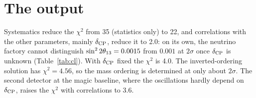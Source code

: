 \section{The output}


\noindent
Systematics reduce the $\chi^2$ from 35 (statistics only) to 22, and
correlations with the other parameters, mainly $\delta_\mathrm{CP}$, reduce it to 2.0: on
its own, the neutrino factory cannot distinguish $\sin^2 2\theta_{13}=0.0015$ from
$0.001$ at $2\sigma$ once $\delta_\mathrm{CP}$ is unknown (Table~\ref{tab:cl}). With $\delta_\mathrm{CP}$
fixed the $\chi^2$ is 4.0. The inverted-ordering solution has $\chi^2=4.56$, so
the mass ordering is determined at only about $2\sigma$. The second detector at
the magic baseline, where the oscillations hardly depend on $\delta_\mathrm{CP}$, raises the
$\chi^2$ with correlations to 3.6.
